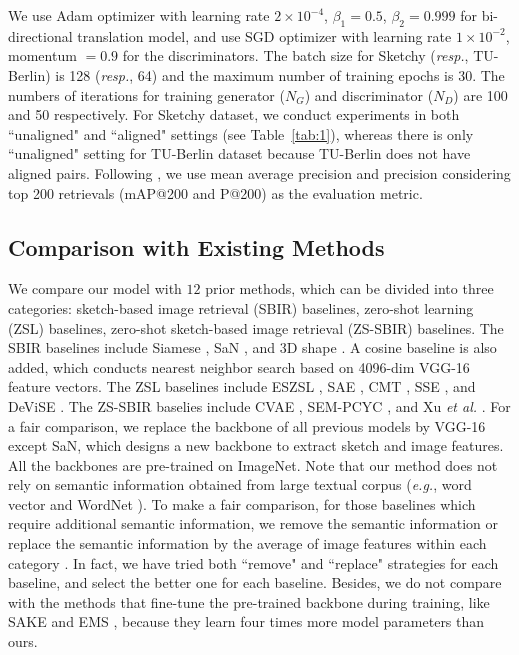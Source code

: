 \documentclass[10pt,twocolumn,letterpaper]{article}
\begin{document}
We use Adam \cite{kingma2014adam} optimizer with learning rate $2 \times 10^{-4}$, $\beta_1 = 0.5$, $\beta_2 = 0.999$ for bi-directional translation model, and use SGD optimizer with learning rate $1 \times 10^{-2}$, momentum $=0.9$ for the discriminators. The batch size for Sketchy (\emph{resp.}, TU-Berlin) is 128 (\emph{resp.}, 64) and the maximum number of training epochs is 30. The numbers of iterations for training generator ($N_{G}$) and discriminator ($N_{D}$) are 100 and 50 respectively. For Sketchy dataset, we conduct experiments in both ``unaligned" and ``aligned" settings (see Table~\ref{tab:1}), whereas there is only ``unaligned" setting for TU-Berlin dataset because TU-Berlin does not have aligned pairs. Following \cite{yelamarthi2018zero}, we use mean average precision and precision considering top 200 retrievals (mAP@200 and P@200) as the evaluation metric.

\subsection{Comparison with Existing Methods}
We compare our model with $12$ prior methods, which can be divided into three categories: sketch-based image retrieval (SBIR) baselines, zero-shot learning (ZSL) baselines, zero-shot sketch-based image retrieval (ZS-SBIR) baselines. 
The SBIR baselines include Siamese \cite{yelamarthi2018zero}, SaN \cite{yu2017sketch}, and 3D shape \cite{wang2015sketch}. A cosine baseline is also added, which conducts nearest neighbor search based on 4096-dim VGG-16 \cite{simonyan2014very} feature vectors.
The ZSL baselines include ESZSL \cite{romera2015embarrassingly}, SAE \cite{kodirov2017semantic}, CMT \cite{socher2013zero}, SSE \cite{zhang2015bit}, and DeViSE \cite{frome2013devise}.
The ZS-SBIR baselies include CVAE \cite{yelamarthi2018zero}, SEM-PCYC \cite{dutta2019semantically}, and Xu \textit{et al.} \cite{xu2019semantic}.
For a fair comparison, we replace the backbone of all previous models by VGG-16 except SaN, which designs a new backbone to extract sketch and image features. 
All the backbones are pre-trained on ImageNet. 
Note that our method does not rely on semantic information obtained from large textual corpus (\emph{e.g.}, word vector \cite{mikolov2013distributed} and WordNet \cite{miller1998wordnet}). To make a fair comparison, for those baselines which require additional semantic information, we remove the semantic information \cite{dutta2019semantically} or replace the semantic information by the average of image features within each category \cite{wang2015sketch, romera2015embarrassingly, kodirov2017semantic, socher2013zero, zhang2015bit, frome2013devise, xu2019semantic} \protect\footnotemark[1]. In fact, we have tried both ``remove" and ``replace" strategies for each baseline, and select the better one for each baseline.
Besides, we do not compare with the methods that fine-tune the pre-trained backbone during training, like SAKE \cite{liu2019semantic} and EMS \cite{lu2018learning}, because they learn four times more model parameters than ours.
\end{document}
